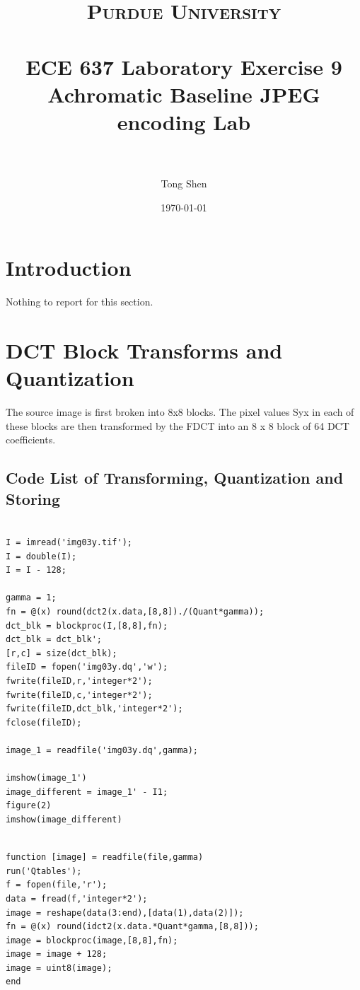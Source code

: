 \documentclass[paper=a4, fontsize=11pt]{scrartcl} %
\title{	
\normalfont \normalsize 
\textsc{Purdue University} \\ [25pt] %
\horrule{0.5pt} \\[0.4cm] %
\huge ECE 637 Laboratory Exercise 9\\ 
\huge Achromatic Baseline JPEG encoding Lab\\%
\horrule{2pt} \\[0.5cm] %
}
\author{Tong Shen} %
\date{\normalsize\today} %
\numberwithin{equation}{section} %
\numberwithin{figure}{section} %
\numberwithin{table}{section} %
\begin{document}
\maketitle %

\section{Introduction}
Nothing to report for this section. 

\section{ DCT Block Transforms and Quantization}
The source image is first broken into 8x8 blocks. The pixel values Syx in each of these blocks
are then transformed by the FDCT into an 8 x 8 block of 64 DCT coefficients.

\subsection{Code List of Transforming, Quantization and Storing}

\begin{lstlisting}[frame=single]

I = imread('img03y.tif');
I = double(I);
I = I - 128;

gamma = 1;
fn = @(x) round(dct2(x.data,[8,8])./(Quant*gamma));
dct_blk = blockproc(I,[8,8],fn);
dct_blk = dct_blk';
[r,c] = size(dct_blk);
fileID = fopen('img03y.dq','w');
fwrite(fileID,r,'integer*2');
fwrite(fileID,c,'integer*2');
fwrite(fileID,dct_blk,'integer*2');
fclose(fileID);

image_1 = readfile('img03y.dq',gamma);

imshow(image_1')
image_different = image_1' - I1;
figure(2)
imshow(image_different)

\end{lstlisting}
\begin{lstlisting}[frame=single]

function [image] = readfile(file,gamma)
run('Qtables');
f = fopen(file,'r');
data = fread(f,'integer*2');
image = reshape(data(3:end),[data(1),data(2)]);
fn = @(x) round(idct2(x.data.*Quant*gamma,[8,8]));
image = blockproc(image,[8,8],fn);
image = image + 128;
image = uint8(image);
end

\end{lstlisting}
\end{document}
